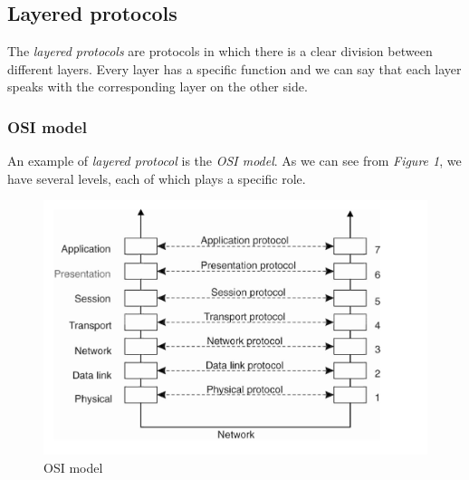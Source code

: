 \subsection{Layered protocols}
The \textit{layered protocols} are protocols in which there is a clear division between different layers. Every layer has a specific function and we can say that each layer speaks with the corresponding layer on the other side.

\subsubsection{OSI model}
An example of \textit{layered protocol} is the \textit{OSI model}. As we can see from \textit{Figure 1}, we have several levels, each of which plays a specific role. 

\begin{figure}[h]
\caption{OSI model}
\includegraphics[width=\textwidth]{src/images/osi-model.png}
\centering
\end{figure}

